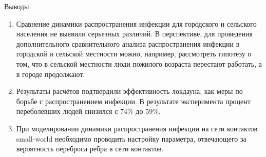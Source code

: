 \documentclass[10pt, unicode, xcolor={svgnames, table, hyperref}]{beamer}
\begin{document}
\begin{frame}{Выводы}
	\begin{enumerate}
		
		\item Сравнение динамики распространения инфекции для городского и сельского
		населения не выявили серьезных различий. В перспективе, для проведения дополнительного сравнительного анализа распространения
		инфекции в городской и сельской местности можно, например, рассмотреть гипотезу о том, что в сельской местности люди пожилого возраста перестают работать,
		а в городе продолжают.
	
		\item 	Результаты расчётов подтвердили эффективность локдауна, как меры по борьбе с распространением инфекции. В результате эксперимента процент переболевших людей снизился с 74\% до 59\%.
		
		\item При моделировании динамики распространения инфекции на сети контактов small-world необходимо проводить настройку параметра, отвечающего за вероятность переброса ребра в сети контактов.
		
	\end{enumerate}
	
\end{frame}






	
\end{document}
